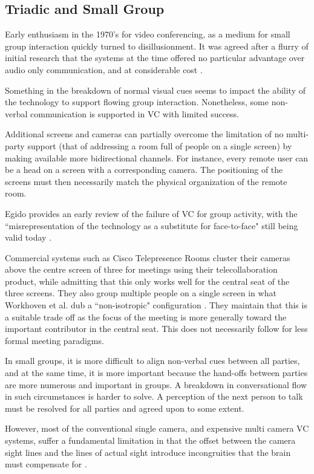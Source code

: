         \subsection{Triadic and Small Group}
Early enthusiasm in the 1970's for video conferencing, as a medium for small group interaction quickly turned to disillusionment. It was agreed after a flurry of initial research that the systems at the time offered no particular advantage over audio only communication, and at considerable cost \cite{Williams1977}.\par
Something in the breakdown of normal visual cues seems to impact the ability of the technology to support flowing group interaction. Nonetheless, some non-verbal communication is supported in VC with limited success. \par
Additional screens and cameras can partially overcome the limitation of no multi-party support (that of addressing a room full of people on a single screen) by making available more bidirectional channels. For instance, every remote user can be a head on a screen with a corresponding camera. The positioning of the screens must then necessarily match the physical organization of the remote room.\par
Egido provides an early review of the failure of VC for group activity, with the ``misrepresentation of the technology as a substitute for face-to-face" still being valid today \cite{Edigo1988}.\par
Commercial systems such as Cisco Telepresence Rooms cluster their cameras above the centre screen of three for meetings using their telecollaboration product, while admitting that this only works well for the central seat of the three screens. They also group multiple people on a single screen in what Workhoven et al. dub a ``non-isotropic" configuration \cite{Pejsa2016}. They maintain that this is a suitable trade off as the focus of the meeting is more generally toward the important contributor in the central seat. This does not necessarily follow for less formal meeting paradigms.\par
            In small groups, it is more difficult to align non-verbal cues between all  parties, and at the same time, it is more important because the hand-offs between parties are more numerous and important in groups. A breakdown in conversational flow in such circumstances is harder to solve. A perception of the next person to talk must be resolved for all parties and agreed upon to some extent.\par
                However, most of the conventional single camera, and expensive multi camera VC systems, suffer a fundamental limitation in that the offset between the camera sight lines and the lines of actual sight introduce incongruities that the brain must compensate for \cite{Wolff2008}.\par
